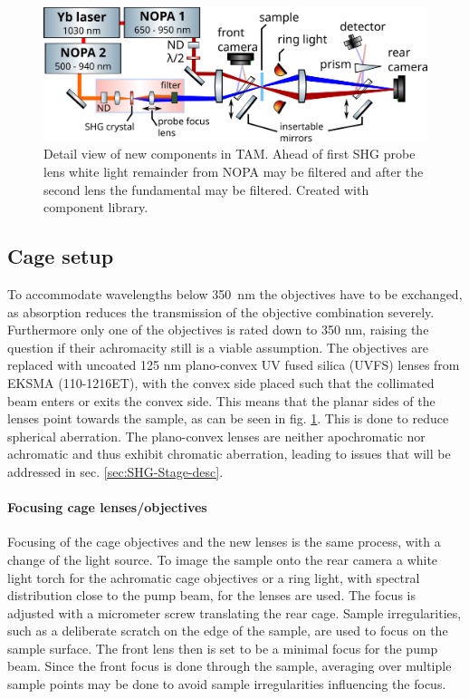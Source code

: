 \documentclass[twoside,openright,listof=numbered]{scrreprt}
\begin{document}
\begin{figure}[h]
\centering
\includegraphics[width=0.9\linewidth]{images/ComponentLibrary_svg/SHG-focusing-large.png}
\caption[Detail view of new components in the transient absorption microscope.]{Detail view of new components in TAM. Ahead of first SHG probe lens white light remainder from NOPA may be filtered and after the second lens the fundamental may be filtered. Created with component library.\label{fig:CageSetup}}
\end{figure}

\subsection{Cage setup}\label{sec:cageSetup}
To accommodate wavelengths below \qty{350}{\nano\meter} the objectives have to be exchanged, as absorption reduces the transmission of the objective combination severely. Furthermore only one of the objectives is rated down to 350 nm, raising the question if their achromacity still is a viable assumption.\newline
The objectives are replaced with  uncoated 125 nm plano-convex UV fused silica (UVFS) lenses from EKSMA (110-1216ET), with the convex side placed such that the collimated beam enters or exits the convex side. This means that the planar sides of the lenses point towards the sample, as can be seen in fig. \ref{fig:CageSetup}. This is done to reduce spherical aberration.
The plano-convex lenses are neither apochromatic nor achromatic and thus exhibit chromatic aberration, leading to issues that will be addressed in sec. \ref{sec:SHG-Stage-desc}. \newline

\paragraph{Focusing cage lenses/objectives}
Focusing of the cage objectives and the new lenses is the same process, with a change of the light source. To image the sample onto the rear camera a white light torch for the achromatic cage objectives or a ring light, with spectral distribution close to the pump beam, for the lenses are used. The focus is adjusted with a micrometer screw translating the rear cage. Sample irregularities, such as a deliberate scratch on the edge of the sample, are used to focus on the sample surface. The front lens then is set to be a minimal focus for the pump beam. Since the front focus is done through the sample, averaging over multiple sample points may be done to avoid sample irregularities influencing the focus.
\end{document}
